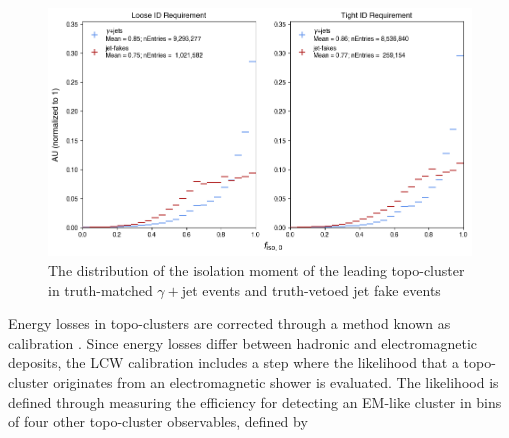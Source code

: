 \begin{figure}[htb]
    \centering 
    \includegraphics[width=\textwidth]{chapters/chapter4_photonID/images/hists/y_topoCluster0_isolation.png}
    \caption[The distribution of the isolation moment of the leading topo-cluster]{The distribution of the isolation moment of the leading topo-cluster in truth-matched $\gamma+$jet events and truth-vetoed jet fake events}
    \label{fig:topo-isolation}
\end{figure}

Energy losses in topo-clusters are corrected through a method known as  calibration \cite{lcw-calib}. Since energy losses differ between hadronic and electromagnetic deposits, the \gls{LCW} calibration includes a step where the likelihood that a topo-cluster originates from an electromagnetic shower is evaluated. The likelihood is defined through measuring the efficiency for detecting an EM-like cluster in bins of four other topo-cluster observables, defined by

